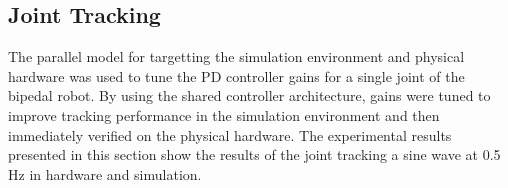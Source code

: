\subsection{Joint Tracking} %
\label{sub:joint_tracking}
The parallel model for targetting the simulation environment and physical hardware was used to tune the PD controller gains for a single joint of the bipedal robot. By using the shared controller architecture, gains were tuned to improve tracking performance in the simulation environment and then immediately verified on the physical hardware. The experimental results presented in this section show the results of the joint tracking a sine wave at 0.5 Hz in hardware and simulation. 


\Incomplete

\cleardoublepage


